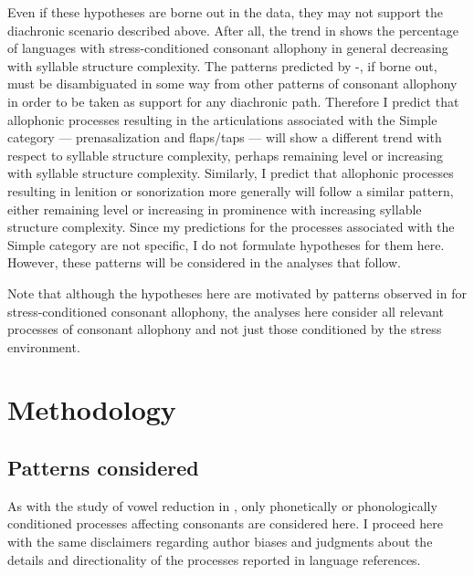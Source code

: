   Even if these hypotheses are borne out in the data, they may not support the diachronic scenario described above. After all, the trend in  shows the percentage of languages with stress-conditioned consonant allophony in general decreasing with syllable structure complexity. The patterns predicted by -, if borne out, must be disambiguated in some way from other patterns of consonant allophony in order to be taken as support for any diachronic path. Therefore I predict that allophonic processes resulting in the articulations associated with the Simple category — prenasalization and flaps/taps — will show a different trend with respect to syllable structure complexity, perhaps remaining level or increasing with syllable structure complexity. Similarly, I predict that allophonic processes resulting in lenition or sonorization more generally will follow a similar pattern, either remaining level or increasing in prominence with increasing syllable structure complexity. Since my predictions for the processes associated with the Simple category are not specific, I do not formulate hypotheses for them here. However, these patterns will be considered in the analyses that follow.

  Note that although the hypotheses here are motivated by patterns observed in  for stress-conditioned consonant allophony, the analyses here consider all relevant processes of consonant allophony and not just those conditioned by the stress environment.

\section{Methodology}\label{sec:7.2}
\subsection{Patterns considered}\label{sec:7.2.1}

  As with the study of vowel reduction in , only phonetically or phonologically conditioned processes affecting consonants are considered here. I proceed here with the same disclaimers regarding author biases and judgments about the details and directionality of the processes reported in language references.

